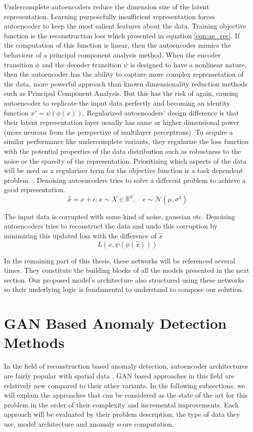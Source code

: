 Undercomplete autoencoders reduce the dimension size of the latent representation. Learning
purposefully insufficient representation forces autoencoder to keep the most salient features about
the data. Training objective function is the reconstruction loss which presented in equation
\ref{eqn:ae_rec}. If the computation of this function is linear, then the autoencoder mimics the
behaviour of a principal component analysis method. When the encoder transition $\phi$ and the
decoder transition $\psi$ is designed to have a nonlinear nature, then the autoencoder has the
ability to capture more complex reprensetation of the data, more powerful approach than known dimensionality 
reduction methods such as Principal Component Analysis. But this has the risk of again, causing 
autoencoder to replicate the input data perfectly and becoming an identity function $x' = \psi(\phi(x))$. 
Regularized autoencoders' design difference is that their latent representation layer usually has same 
or higher dimensional power (more neurons from the perspective of multilayer perceptrons). 
To acquire a similar performance like undercomplete variants, they regularize the loss function  
with the potential properties of the data distribution such as robustness to the noise or the 
sparsity of the representation. Prioritizing which aspects of the data will be used as a regularizer 
term for the objective function is a task dependent problem. \cite{Goodfellow-et-al-2016}. 
Denoising autoencoders tries to solve a different problem to achieve a good representation. 
$$
\hat{x} = x + \epsilon : x \sim X \in \mathbb{R}^d ,\quad \epsilon \sim \mathcal{N}(\mu, \sigma^2)
$$

The input data is corrupted with some kind of noise, gaussian etc. Denoising autoencoders tries to
reconstruct the data and undo this corruption by minimizing this updated loss with the difference of
$\hat{x}$
$$
L(x, \psi(\phi(\hat{x})))
$$

In the remaining part of this thesis, these networks will be referenced several times. They constitute the 
building blocks of all the models presented in the next section. Our proposed model's architecture also structured 
using these networks so their underlying logic is fundamental to understand to compose our solution.

\section{GAN Based Anomaly Detection Methods}
\label{sec:gan_based_sota}
In the field of reconstruction based anomaly detection, autoencoder architectures 
are fairly popular with spatial data \cite{baldi2012autoencoders,leveau2017adversarial,an2015variational}.
GAN based approaches in this field are relatively new compared to their other variants.
In the following subsections, we will explain the approaches that can be considered as the state of
the art for this problem in the order of their complexity and incremental improvements. Each
approach will be evaluated by their problem description, the type of data they use, model
architecture and anomaly score computation. 

